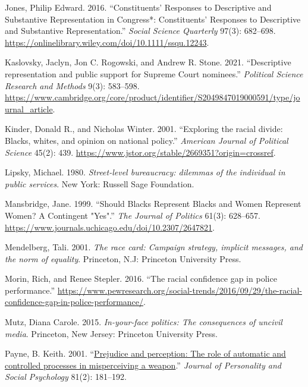 \documentclass[
  12pt,
]{article}
\newlength{\cslhangindent}
\newlength{\cslentryspacingunit} %
\newenvironment{CSLReferences}[2] %
 {%
  \setlength{\parindent}{0pt}
  \ifodd #1
  \let\oldpar\par
  \def\par{\hangindent=\cslhangindent\oldpar}
  \fi
  \setlength{\parskip}{#2\cslentryspacingunit}
 }%
 {}
\begin{document}
\begin{CSLReferences}{1}{0}
\leavevmode{}%
Jones, Philip Edward. 2016. {``Constituents' Responses to Descriptive
and Substantive Representation in Congress*: Constituents' Responses to
Descriptive and Substantive Representation.''} \emph{Social Science
Quarterly} 97(3): 682--698.
\url{https://onlinelibrary.wiley.com/doi/10.1111/ssqu.12243}.

\leavevmode{}%
Kaslovsky, Jaclyn, Jon C. Rogowski, and Andrew R. Stone. 2021.
{``Descriptive representation and public support for Supreme Court
nominees.''} \emph{Political Science Research and Methods} 9(3):
583--598.
\url{https://www.cambridge.org/core/product/identifier/S2049847019000591/type/journal_article}.

\leavevmode{}%
Kinder, Donald R., and Nicholas Winter. 2001. {``Exploring the racial
divide: Blacks, whites, and opinion on national policy.''}
\emph{American Journal of Political Science} 45(2): 439.
\url{https://www.jstor.org/stable/2669351?origin=crossref}.

\leavevmode{}%
Lipsky, Michael. 1980. \emph{Street-level bureaucracy: dilemmas of the
individual in public services}. New York: Russell Sage Foundation.

\leavevmode{}%
Mansbridge, Jane. 1999. {``Should Blacks Represent Blacks and Women
Represent Women? A Contingent {"}Yes{"}.''} \emph{The Journal of
Politics} 61(3): 628--657.
\url{https://www.journals.uchicago.edu/doi/10.2307/2647821}.

\leavevmode{}%
Mendelberg, Tali. 2001. \emph{The race card: Campaign strategy, implicit
messages, and the norm of equality}. Princeton, N.J: Princeton
University Press.

\leavevmode{}%
Morin, Rich, and Renee Stepler. 2016. {``The racial confidence gap in
police performance.''}
\url{https://www.pewresearch.org/social-trends/2016/09/29/the-racial-confidence-gap-in-police-performance/}.

\leavevmode{}%
Mutz, Diana Carole. 2015. \emph{In-your-face politics: The consequences
of uncivil media}. Princeton, New Jersey: Princeton University Press.

\leavevmode{}%
Payne, B. Keith. 2001.
{``\href{https://doi.org/10.1037/0022-3514.81.2.181}{Prejudice and
perception: The role of automatic and controlled processes in
misperceiving a weapon}.''} \emph{Journal of Personality and Social
Psychology} 81(2): 181--192.


\end{CSLReferences}
\end{document}
